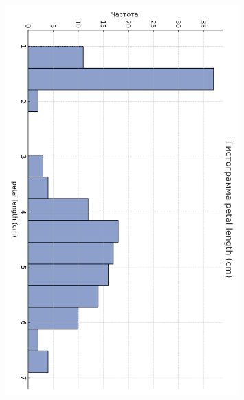 \begin{figure}[H]\ContinuedFloat
  \centering
  \includegraphics[width=0.8\textwidth]{images/histo_petal_length_cm_cb2.png}\\[6pt]

\end{figure}
